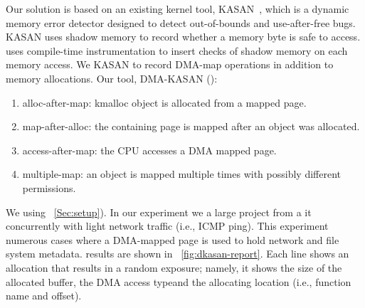 Our solution is based on an existing kernel tool, KASAN~\cite{kasan}, which is a dynamic memory error detector designed to detect out-of-bounds and use-after-free bugs. KASAN uses shadow memory to record whether a memory byte is safe to access. \DIFdelbegin {}\DIFdelend \DIFaddbegin {}\DIFaddend uses compile-time instrumentation to insert checks of shadow memory on each memory access. 
We \DIFdelbegin {}\DIFdelend \DIFaddbegin {}\DIFaddend KASAN to record DMA-map operations in addition to memory allocations. Our tool, \DIFdelbegin {}\DIFdelend \DIFaddbegin {}\DIFaddend DMA-KASAN (\dkasan)\DIFdelbegin {}\DIFdelend \DIFaddbegin {}\DIFaddend : 
\begin{enumerate}
    \item alloc-after-map:  kmalloc object is allocated from a mapped page.
    \item map-after-alloc:  the containing page is mapped after an object was allocated.
    \item access-after-map: the CPU accesses a DMA mapped page.
    \item multiple-map: an object is mapped multiple times with possibly different permissions.
\end{enumerate}
We \DIFdelbegin {}\DIFdelend \DIFaddbegin {}\DIFaddend \dkasan using \DIFdelbegin {}\DIFdelend \DIFaddbegin {}\DIFaddend ~\ref{Sec:setup}).
In our experiment we \DIFdelbegin {}\DIFdelend \DIFaddbegin {}\DIFaddend a large project from a \DIFdelbegin {}\DIFdelend \DIFaddbegin {}\DIFaddend it concurrently with light network traffic (i.e., ICMP ping). This experiment \DIFdelbegin {}\DIFdelend \DIFaddbegin {}\DIFaddend numerous cases where a DMA-mapped page is used to hold network and file system metadata. \DIFdelbegin {}\DIFdelend \DIFaddbegin {}\DIFaddend results are shown in \DIFdelbegin {}\DIFdelend \DIFaddbegin {}\DIFaddend ~\ref{fig:dkasan-report}. Each line shows an allocation that results in a random exposure; namely, it shows the size of the allocated buffer, the DMA access type\DIFaddbegin \DIFadd{, }\DIFaddend and the allocating location (i.e., function name and offset).

